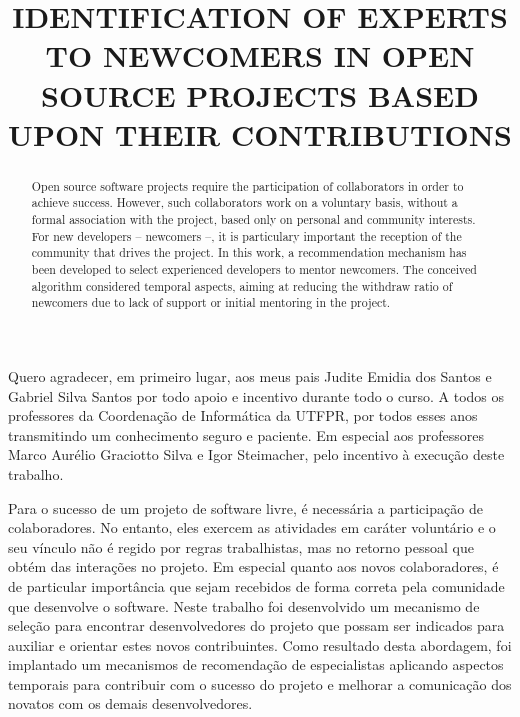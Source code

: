 \documentclass[oneside,brazil,a4paper]{normas-utf-tex}
\title{\MakeUppercase{Identification of experts to newcomers in open source projects based upon their contributions}} %
\begin{document}
\capa
\folhaderosto

\begin{agradecimentos}
Quero agradecer, em primeiro lugar, aos meus pais Judite Emidia dos Santos e Gabriel Silva Santos por todo apoio e incentivo durante todo o curso. A todos os professores da Coordenação de Informática da UTFPR, por todos esses anos transmitindo um conhecimento seguro e paciente. Em especial aos professores Marco Aurélio Graciotto Silva e Igor Steimacher, pelo incentivo à execução deste trabalho.
\end{agradecimentos}

\begin{resumo}
Para o sucesso de um projeto de software livre, é necessária a participação de colaboradores. No entanto, eles exercem as atividades em caráter voluntário e o seu vínculo não é regido por regras trabalhistas, mas no retorno pessoal que obtém das interações no projeto. Em especial quanto aos novos colaboradores, é de particular importância que sejam recebidos de forma correta pela comunidade que desenvolve o software. Neste trabalho foi desenvolvido um mecanismo de seleção para encontrar desenvolvedores do projeto que possam ser indicados para auxiliar e orientar estes novos contribuintes. Como resultado desta abordagem, foi implantado um mecanismos de recomendação de especialistas aplicando aspectos temporais para contribuir com o sucesso do projeto e  melhorar a comunicação dos novatos com os demais desenvolvedores.
\end{resumo}

%
\begin{abstract}
Open source software projects require the participation of collaborators in order to achieve success. However, such collaborators work on a voluntary basis, without a formal association with the project, based only on personal and community interests. For new developers -- newcomers --, it is particulary important the reception of the community that drives the project. In this work, a recommendation mechanism has been developed to select experienced developers to mentor newcomers. The conceived algorithm considered temporal aspects, aiming at reducing the withdraw ratio of newcomers due to lack of support or initial mentoring in the project.
\end{abstract}


\listadefiguras
\clearpage
\listadetabelas
\sumario
\end{document}
